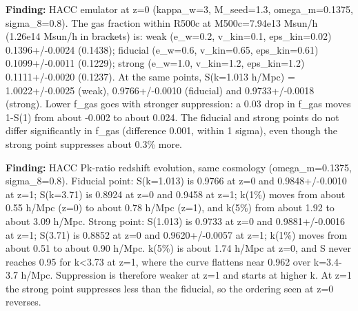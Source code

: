 \documentclass[11pt,a4paper]{article}
\begin{document}
\textbf{Finding:} HACC emulator at z=0 (kappa\_w=3, M\_seed=1.3, omega\_m=0.1375, sigma\_8=0.8). The gas fraction within R500c at M500c=7.94e13 Msun/h (1.26e14 Msun/h in brackets) is: weak (e\_w=0.2, v\_kin=0.1, eps\_kin=0.02) 0.1396+/-0.0024 (0.1438); fiducial (e\_w=0.6, v\_kin=0.65, eps\_kin=0.61) 0.1099+/-0.0011 (0.1229); strong (e\_w=1.0, v\_kin=1.2, eps\_kin=1.2) 0.1111+/-0.0020 (0.1237). At the same points, S(k=1.013 h/Mpc) = 1.0022+/-0.0025 (weak), 0.9766+/-0.0010 (fiducial) and 0.9733+/-0.0018 (strong). Lower f\_gas goes with stronger suppression: a 0.03 drop in f\_gas moves 1-S(1) from about -0.002 to about 0.024. The fiducial and strong points do not differ significantly in f\_gas (difference 0.001, within 1 sigma), even though the strong point suppresses about 0.3\% more.

\textbf{Finding:} HACC Pk-ratio redshift evolution, same cosmology (omega\_m=0.1375, sigma\_8=0.8). Fiducial point: S(k=1.013) is 0.9766 at z=0 and 0.9848+/-0.0010 at z=1; S(k=3.71) is 0.8924 at z=0 and 0.9458 at z=1; k(1\%) moves from about 0.55 h/Mpc (z=0) to about 0.78 h/Mpc (z=1), and k(5\%) from about 1.92 to about 3.09 h/Mpc. Strong point: S(1.013) is 0.9733 at z=0 and 0.9881+/-0.0016 at z=1; S(3.71) is 0.8852 at z=0 and 0.9620+/-0.0057 at z=1; k(1\%) moves from about 0.51 to about 0.90 h/Mpc. k(5\%) is about 1.74 h/Mpc at z=0, and S never reaches 0.95 for k\textless{}3.73 at z=1, where the curve flattens near 0.962 over k=3.4-3.7 h/Mpc. Suppression is therefore weaker at z=1 and starts at higher k. At z=1 the strong point suppresses less than the fiducial, so the ordering seen at z=0 reverses.
\end{document}
